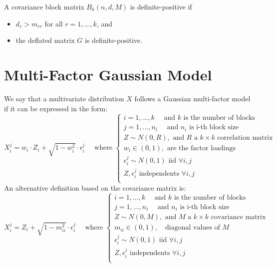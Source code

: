 \documentclass[11pt,fleqn]{book} %
\begin{document}
\begin{corollary}
	A covariance block matrix $B_k(n,d,M)$ is definite-positive if
	\begin{itemize}
		\item $d_r > m_{rr}$ for all $r=1,\dots,k$, and
		\item the deflated matrix $G$ is definite-positive.
	\end{itemize}
\end{corollary}

\section{Multi-Factor Gaussian Model}
\label{ap:mfgm}

\begin{definition}
	\label{def:gmfm}
	We say that a multivariate distribution $X$ follows a Gaussian multi-factor
	model if it can be expressed in the form:
	\begin{displaymath}
		X_i^j = w_i \cdot Z_i + \sqrt{1-w_i^2} \cdot \epsilon_i^j
		\quad \text{ where } \left\{
		\begin{array}{l}
			i = 1, \dots, k \quad \text{ and $k$ is the number of blocks}    \\
			j = 1, \dots, n_i \quad \text{ and $n_i$ is i-th block size}     \\
			Z \sim N(0,R), \text{ and $R$ a $k {\times} k$ correlation matrix} \\
			w_i \in (0,1), \text{ are the factor loadings }                  \\
			\epsilon_i^j \sim N(0,1) \text { iid } \forall i,j               \\
			Z, \epsilon_i^j \text{ independents } \forall i,j                \\
		\end{array}
		\right.
	\end{displaymath}
	An alternative definition based on the covariance matrix is:
	\begin{displaymath}
		X_i^j = Z_i + \sqrt{1-m_{ii}^2} \cdot \epsilon_i^j
		\quad \text{ where } \left\{
		\begin{array}{l}
			i = 1, \dots, k \quad \text{ and $k$ is the number of blocks}    \\
			j = 1, \dots, n_i \quad \text{ and $n_i$ is i-th block size}     \\
			Z \sim N(0,M), \text{ and $M$ a $k {\times} k$ covariance matrix} \\
			m_{ii} \in (0,1), \quad \text{diagonal values of $M$}            \\
			\epsilon_i^j \sim N(0,1) \text { iid } \forall i,j               \\
			Z, \epsilon_i^j \text{ independents } \forall i,j                \\
		\end{array}
		\right.
	\end{displaymath}
\end{definition}
\end{document}
